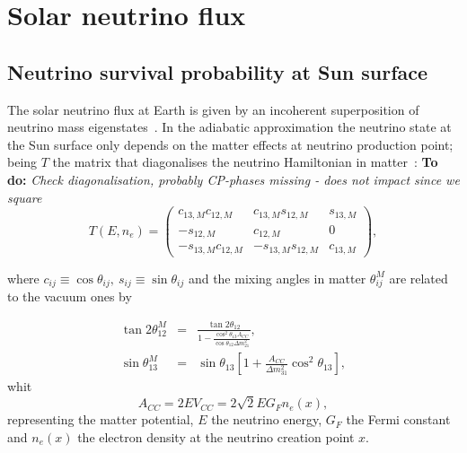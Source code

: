 \documentclass{article}
\newcommand{\todo}[1]{\textbf{To do:} \emph{\color{blue} #1}}
\begin{document}
\section{Solar neutrino flux}
	\subsection{Neutrino survival probability at Sun surface}
The solar neutrino flux at Earth is given by an incoherent superposition of neutrino mass eigenstates~\cite{Mikheev:1987wa, Lisi:1997yc}. In the adiabatic approximation the neutrino state at the Sun surface only depends on the matter effects at neutrino production point; being $T$ the matrix that diagonalises the neutrino Hamiltonian in matter~\cite{FiuzadeBarros:2011qna}: \todo{Check diagonalisation, probably CP-phases missing - does not impact since we square}
\begin{equation}
	T\left(E, n_e\right) =\left( \begin{array}{ccc}
		c_{13, M} c_{12, M} & c_{13,M} s_{12, M} & s_{13, M} \\
		-s_{12, M} & c_{12,M} & 0 \\
		-s_{13,M} c_{12,M} & -s_{13,M} s_{12,M} & c_{13, M}
	\end{array}
	\right),
\end{equation}
	
%	
	
where $c_{ij} \equiv \cos \theta_{ij},\ s_{ij} \equiv \sin \theta_{ij}$ and the mixing angles in matter $\theta_{ij}^M$ are related to the vacuum ones by

\begin{eqnarray}
	\tan 2 \theta_{12}^M &=& \frac{\tan 2 \theta_{12}}{1-\frac{\cos^2 \theta_{13} A_{CC}}{\cos \theta_{12} \Delta m^2_{21}} },\\
	\sin \theta_{13}^M &=& \sin \theta_{13} \left[1 + \frac{A_{CC}}{\Delta m^2_{31}} \cos^2\theta_{13}\right],
\end{eqnarray}
whit
\begin{equation}
	A_{CC} = 2 E V_{CC} = 2 \sqrt{2} E G_F n_e(x),
\end{equation}
representing the matter potential,  $E$ the neutrino energy, $G_F$ the Fermi constant and $n_e(x)$ the electron density at the neutrino creation point $x$.
\end{document}
